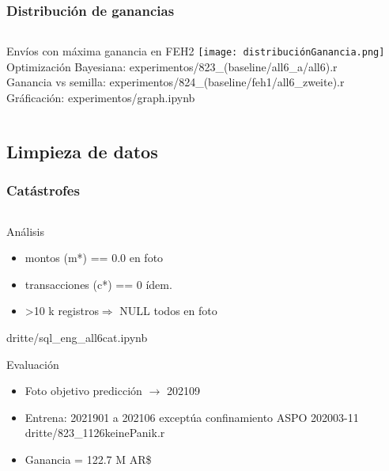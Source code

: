 \documentclass[aspectratio=169]{beamer} %
\begin{document}
\begin{frame}
  \frametitle{Distribución de ganancias}
  \begin{columns}[onlytextwidth]
    \begin{column}{.6\textwidth}
      \begin{block}{Envíos con máxima ganancia en FEH2}
        \texttt{[image: distribuciónGanancia.png]}
        {\tiny Optimización Bayesiana: experimentos/823\_(baseline/all6\_a/all6).r\\
        Ganancia vs semilla: experimentos/824\_(baseline/feh1/all6\_zweite).r\\ Gráficación: experimentos/graph.ipynb\\
        }
      \end{block}
    \end{column}
  \end{columns}      
\end{frame}



\subsection{Limpieza de datos}

\begin{frame}
  \frametitle{Catástrofes}
  \begin{columns}[onlytextwidth]
    \begin{column}{.6\textwidth}
      \begin{block}{Análisis}
        \begin{itemize}
          \item montos (m*) == 0.0 en foto
          \item transacciones (c*) == 0 ídem.
          \item \textgreater 10 k registros$\Rightarrow$ NULL todos en foto
        \end{itemize}
        {\tiny dritte/sql\_eng\_all6cat.ipynb}
      \end{block}
      \begin{block}{Evaluación}
        \begin{itemize}
          \item Foto objetivo predicción $\rightarrow$ 202109
 			    \item Entrena: 2021901 a 202106
			    exceptúa confinamiento ASPO 202003-11\\
			    {\tiny dritte/823\_1126keinePanik.r}
          \item Ganancia = 122.7 M AR\$
        \end{itemize}
      \end{block}
    \end{column}
  \end{columns}      
\end{frame}
\end{document}
